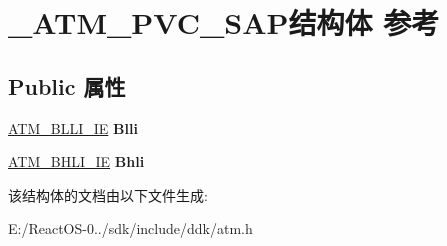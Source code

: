 \hypertarget{struct___a_t_m___p_v_c___s_a_p}{}\section{\+\_\+\+A\+T\+M\+\_\+\+P\+V\+C\+\_\+\+S\+A\+P结构体 参考}
\label{struct___a_t_m___p_v_c___s_a_p}
\subsection*{Public 属性}
\begin{DoxyCompactItemize}
\item 
\mbox{\label{struct___a_t_m___p_v_c___s_a_p_a417faa095b17395ddeb2e1205cba037e}} 
\hyperlink{struct_a_t_m___b_l_l_i___i_e}{A\+T\+M\+\_\+\+B\+L\+L\+I\+\_\+\+IE} {\bfseries Blli}
\item 
\mbox{\label{struct___a_t_m___p_v_c___s_a_p_a481000b176fb2873949f5a9ac74608e9}} 
\hyperlink{struct___a_t_m___b_h_l_i___i_e}{A\+T\+M\+\_\+\+B\+H\+L\+I\+\_\+\+IE} {\bfseries Bhli}
\end{DoxyCompactItemize}


该结构体的文档由以下文件生成\+:\begin{DoxyCompactItemize}
\item 
E\+:/\+React\+O\+S-\/0../sdk/include/ddk/atm.\+h\end{DoxyCompactItemize}
